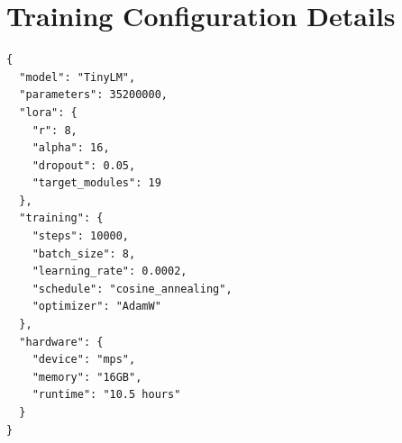 \documentclass[11pt,a4paper,twocolumn]{article}
\theoremstyle{plain}
\theoremstyle{definition}
\begin{document}
\section{Training Configuration Details}

\begin{lstlisting}[caption=Complete Training Configuration]
{
  "model": "TinyLM",
  "parameters": 35200000,
  "lora": {
    "r": 8,
    "alpha": 16,
    "dropout": 0.05,
    "target_modules": 19
  },
  "training": {
    "steps": 10000,
    "batch_size": 8,
    "learning_rate": 0.0002,
    "schedule": "cosine_annealing",
    "optimizer": "AdamW"
  },
  "hardware": {
    "device": "mps",
    "memory": "16GB",
    "runtime": "10.5 hours"
  }
}
\end{lstlisting}
\end{document}
